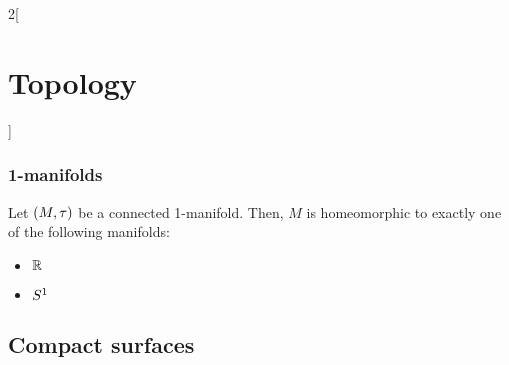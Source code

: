 \documentclass[../../../main_math.tex]{subfiles}
\begin{document}
\begin{multicols}{2}[\section{Topology}]
  \subsubsection{1-manifolds}
  \begin{theorem}
    Let $(M,\topo)$ be a connected 1-manifold. Then, $M$ is homeomorphic to exactly one of the following manifolds:
    \begin{itemize}
      \item $\RR$
      \item $\S^1$
    \end{itemize}
  \end{theorem}
  \subsection{Compact surfaces}

\end{multicols}
\end{document}
